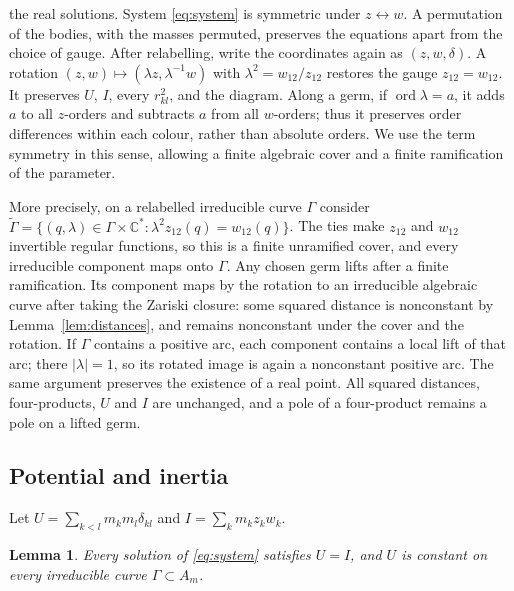 \documentclass[11pt]{amsart}
\newtheorem{lemma}[theorem]{Lemma}
\theoremstyle{definition}
\theoremstyle{remark}
\newcommand{\C}{\mathbb{C}}
\newcommand{\ord}{\operatorname{ord}}
\begin{document}
{the real solutions.  System \eqref{eq:system} is symmetric under $z\leftrightarrow w$.  A permutation of the bodies,
with the masses permuted, preserves the equations apart from the choice of gauge.  After
relabelling, write the coordinates again as $(z,w,\delta)$.  A rotation
$(z,w)\mapsto(\lambda z,\lambda^{-1}w)$ with $\lambda^2=w_{12}/z_{12}$ restores the gauge
$z_{12}=w_{12}$.  It preserves $U$, $I$, every $r_{kl}^2$, and the diagram.  Along a germ,
if $\ord\lambda=a$, it adds $a$ to all $z$-orders and subtracts $a$ from all $w$-orders;
thus it preserves order differences within each colour, rather than absolute orders.
We use the term symmetry in this sense, allowing a finite algebraic cover and a finite
ramification of the parameter.

More precisely, on a relabelled irreducible curve $\Gamma$ consider
$\widetilde\Gamma=\{(q,\lambda)\in\Gamma\times\C^*:
\lambda^2z_{12}(q)=w_{12}(q)\}$.  The ties make $z_{12}$ and $w_{12}$ invertible regular
functions, so this is a finite unramified cover, and every irreducible component maps onto
$\Gamma$.  Any chosen germ lifts after a finite ramification.  Its component maps by the
rotation to an irreducible algebraic curve after taking the Zariski closure: some squared
distance is nonconstant by Lemma~\ref{lem:distances}, and remains nonconstant under the
cover and the rotation.  If $\Gamma$ contains a positive arc, each component contains a
local lift of that arc; there $|\lambda|=1$, so its rotated image is again a nonconstant
positive arc.  The same argument preserves the existence of a real point.  All squared
distances, four-products, $U$ and $I$ are unchanged, and a pole of a four-product remains
a pole on a lifted germ.}

\subsection{Potential and inertia}
Let $U=\sum_{k<l}m_km_l\delta_{kl}$ and $I=\sum_k m_kz_kw_k$.

\begin{lemma}\label{lem:U-constant}
Every solution of \eqref{eq:system} satisfies $U=I$, and $U$ is constant on every irreducible
curve $\Gamma\subset A_m$.
\end{lemma}
\end{document}
